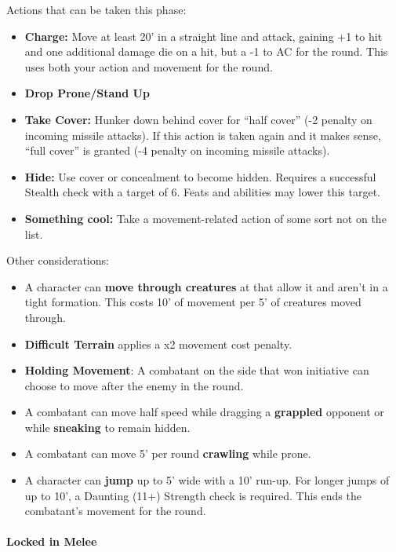 \documentclass{book}
\providecommand{\tightlist}{%
\setlength{\itemsep}{0pt}\setlength{\parskip}{0pt}}
\begin{document}
Actions that can be taken this phase:

\begin{itemize}
\tightlist
\item
  \textbf{Charge:} Move at least 20' in a straight line and attack,
  gaining +1 to hit and one additional damage die on a hit, but a -1 to
  AC for the round. This uses both your action and movement for the
  round.
\item
  \textbf{Drop Prone/Stand Up}
\item
  \textbf{Take Cover:} Hunker down behind cover for ``half cover'' (-2
  penalty on incoming missile attacks). If this action is taken again
  and it makes sense, ``full cover'' is granted (-4 penalty on incoming
  missile attacks).
\item
  \textbf{Hide:} Use cover or concealment to become hidden. Requires a
  successful Stealth check with a target of 6. Feats and abilities may
  lower this target.
\item
  \textbf{Something cool:} Take a movement-related action of some sort
  not on the list.
\end{itemize}

Other considerations:

\begin{itemize}
\tightlist
\item
  A character can \textbf{move through creatures} at that allow it and
  aren't in a tight formation. This costs 10' of movement per 5' of
  creatures moved through.
\item
  \textbf{Difficult Terrain} applies a x2 movement cost penalty.
\item
  \textbf{Holding Movement}: A combatant on the side that won initiative
  can choose to move after the enemy in the round.
\item
  A combatant can move half speed while dragging a \textbf{grappled}
  opponent or while \textbf{sneaking} to remain hidden.
\item
  A combatant can move 5' per round \textbf{crawling} while prone.
\item
  A character can \textbf{jump} up to 5' wide with a 10' run-up. For
  longer jumps of up to 10', a Daunting (11+) Strength check is
  required. This ends the combatant's movement for the round.
\end{itemize}

\paragraph{Locked in Melee}\label{locked-in-melee}
\end{document}
